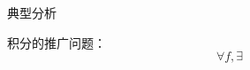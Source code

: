 \documentclass{article}
\begin{document}
\begin{section}{典型分析}

    积分的推广问题：\\
    \begin{equation}
        \forall f, \exists
    \end{equation}

\end{section}
\end{document}
